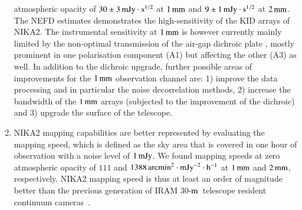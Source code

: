 \documentclass[traditionalabstract]{aa}
\newcommand{\hls}{HLS\,J0918+5142}
\newcommand{\trentemetre}{30-$\rm{m}$}
\newcommand{\lp}[1]{#1}
\begin{document}
\begin{enumerate}
  atmospheric opacity of $30 \pm 3\,\rm{mJy}\cdot s^{1/2}$ at $1\, \rm{mm}$ and
  $9 \pm 1\,\rm{mJy}\cdot s^{1/2}$ at $2\, \rm{mm}$.
  The NEFD estimates demonstrates the high-sensitivity of
  the KID arrays of NIKA2. 
  The instrumental sensitivity at $1\,\rm{mm}$
  is however currently mainly limited by the non-optimal transmission of
  the air-gap dichroic plate%
  , mostly prominent in one polarisation component
  (A1) but affecting the other (A3) as well.
  In addition to the dichroic upgrade, further possible areas of
  improvements for the $1\,\rm{mm}$ observation channel are: 1)
  improve the data processing and in particular the noise
  decorrelation methods, 2) increase the bandwidth of the $1\,\rm{mm}$
  arrays (subjected to the improvement of the dichroic) and 3)
  upgrade the surface of the telescope.
   \vspace{1mm}
\item  NIKA2 mapping capabilities are better represented by evaluating the
  mapping speed, which is defined as the sky area that is covered in one
  hour of observation with a noise level of $1\,\rm{mJy}$. We found
  mapping speeds at zero atmospheric opacity of $111$ and
  $1388\, \rm{arcmin}^2 \cdot \rm{mJy}^{-2} \cdot \rm{h}^{-1}$ at
  $1\, \rm{mm}$ and  $2\, \rm{mm}$, respectively. NIKA2 mapping speed is thus at
  least an order of magnitude better than the previous generation of IRAM
 \trentemetre\ telescope resident continuum cameras~\citep{Catalano2014, Staguhn2011_GISMO, Kreysa1999}.
  
\end{enumerate}
\end{document}
